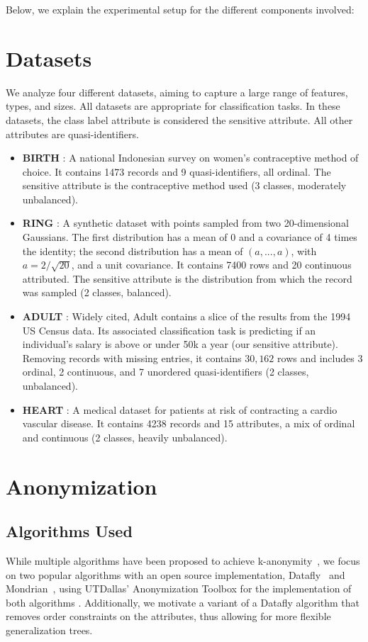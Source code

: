 Below, we explain the experimental setup for the different components involved:

\section{Datasets}
We analyze four different datasets, aiming to capture a large range of features, types, and sizes. All datasets are appropriate for classification tasks. In these datasets, the class label attribute is considered the sensitive attribute. All other attributes are quasi-identifiers.
\begin{itemize}
    \item \textbf{BIRTH} \cite{birth_dataset}: A national Indonesian survey on women’s contraceptive method of choice. It contains 1473 records and 9 quasi-identifiers, all ordinal. The sensitive attribute is the contraceptive method used (3 classes, moderately unbalanced). 
    \item \textbf{RING} \cite{ringnorm_dataset}: A synthetic dataset with points sampled from two 20-dimensional Gaussians. The first distribution has a mean of $0$ and a covariance of 4 times the identity; the second distribution has a mean of $(a,...,a)$, with $a=2/\sqrt{20}$, and a unit covariance. It contains 7400 rows and 20 continuous attributed. The sensitive attribute is the distribution from which the record was sampled (2 classes, balanced).
    \item \textbf{ADULT} \cite{adult_dataset}: Widely cited, Adult contains a slice of the results from the 1994 US Census data. Its associated classification task is predicting if an individual's salary is above or under 50k a year (our sensitive attribute). Removing records with missing entries, it contains $30,162$ rows and includes 3 ordinal, 2 continuous, and 7 unordered quasi-identifiers (2 classes, unbalanced).
    \item \textbf{HEART} \cite{heart_dataset}: A medical dataset for patients at risk of contracting a cardio vascular disease. It contains 4238 records and 15 attributes, a mix of ordinal and continuous (2 classes, heavily unbalanced).
\end{itemize}


\section{Anonymization}


\subsection{Algorithms Used}
While multiple algorithms have been proposed to achieve k-anonymity~\cite{incognito,kanon_algos,mondrian,ola_algo,arx}, we focus on two popular algorithms with an open source implementation, Datafly~\cite{kanon_algos} and Mondrian~\cite{mondrian}, using UTDallas' Anonymization Toolbox for the implementation of both algorithms \cite{utd_toolbox}. Additionally, we motivate a variant of a Datafly algorithm that removes order constraints on the attributes, thus allowing for more flexible generalization trees.

